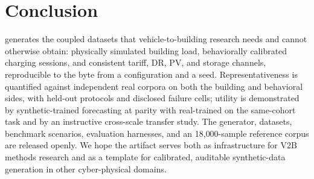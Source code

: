 \section{Conclusion}
\label{sec:conclusion}

\generator{} generates the coupled datasets that vehicle-to-building research
needs and cannot otherwise obtain: physically simulated building load,
behaviorally calibrated charging sessions, and consistent tariff, DR, PV, and
storage channels, reproducible to the byte from a configuration and a seed.
Representativeness is quantified against independent real corpora on both the
building and behavioral sides, with held-out protocols and disclosed failure
cells; utility is demonstrated by synthetic-trained forecasting at parity
with real-trained on the same-cohort task and by an instructive cross-scale
transfer study. The generator, datasets, benchmark scenarios, evaluation
harnesses, and an 18{,}000-sample reference corpus are released openly. We
hope the artifact serves both as infrastructure for V2B methods research and
as a template for calibrated, auditable synthetic-data generation in other
cyber-physical domains.
